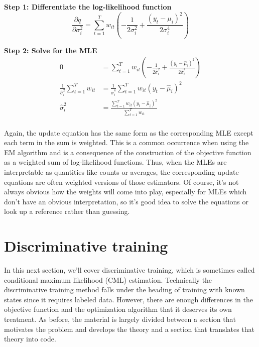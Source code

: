 \textbf{Step 1: Differentiate the log-likelihood function}
\begin{equation*}
\frac{\partial q}{\partial \sigma_i^2} = \sum_{t=1}^T w_{it}
                                         \left( -\frac{1}{2 \sigma_i^2}
                                                + \frac{\left( y_t - \mu_i \right)^2}{2 \sigma_i^4}
                                         \right)
\end{equation*}

\textbf{Step 2: Solve for the MLE}
\begin{align*}
0 &= \sum_{t=1}^T w_{it}
     \left( -\frac{1}{2 \hat{\sigma}_i^2}
            + \frac{\left( y_t - \hat{\mu}_i \right)^2}{2 \hat{\sigma}_i^4}
     \right) \\
\frac{1}{\hat{\sigma}_i^2} \sum_{t=1}^T w_{it} &= \frac{1}{\hat{\sigma}_i^4}
                                                  \sum_{t=1}^T w_{it} \left( y_t - \hat{\mu}_i \right)^2 \\
\hat{\sigma}_i^2 &= \frac{\sum_{t=1}^T w_{it} \left( y_t - \hat{\mu}_i \right)^2}
                         {\sum_{t=1}^T w_{it}} \\
\end{align*}

Again, the update equation has the same form as the corresponding MLE except each term in the sum is weighted. This is a common occurrence when using the EM algorithm and is a consequence of the construction of the objective function as a weighted sum of log-likelihood functions. Thus, when the MLEs are interpretable as quantities like counts or averages, the corresponding update equations are often weighted versions of those estimators. Of course, it's not always obvious how the weights will come into play, especially for MLEs which don't have an obvious interpretation, so it's good idea to solve the equations or look up a reference rather than guessing.

\section{Discriminative training}

In this next section, we'll cover discriminative training, which is sometimes called conditional maximum likelihood (CML) estimation. Technically the discriminative training method falls under the heading of training with known states since it requires labeled data. However, there are enough differences in the objective function and the optimization algorithm that it deserves its own treatment. As before, the material is largely divided between a section that motivates the problem and develops the theory and a section that translates that theory into code.

